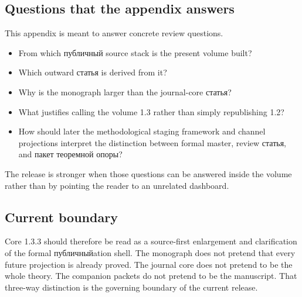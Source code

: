 \subsection{Questions that the appendix answers}

This appendix is meant to answer concrete review questions.

\begin{itemize}
\item From which публичный source stack is the present volume built?
\item Which outward статья is derived from it?
\item Why is the monograph larger than the journal-core статья?
\item What justifies calling the volume 1.3 rather than simply republishing 1.2?
\item How should later the methodological staging framework and channel projections interpret the distinction between formal
      master, review статья, and пакет теоремной опоры?
\end{itemize}

The release is stronger when those questions can be answered inside the volume rather than by
pointing the reader to an unrelated dashboard.

\subsection{Current boundary}

Core 1.3.3 should therefore be read as a source-first enlargement and clarification of the formal
публичныйation shell.
The monograph does not pretend that every future projection is already proved.
The journal core does not pretend to be the whole theory.
The companion packets do not pretend to be the manuscript.
That three-way distinction is the governing boundary of the current release.

\clearpage
